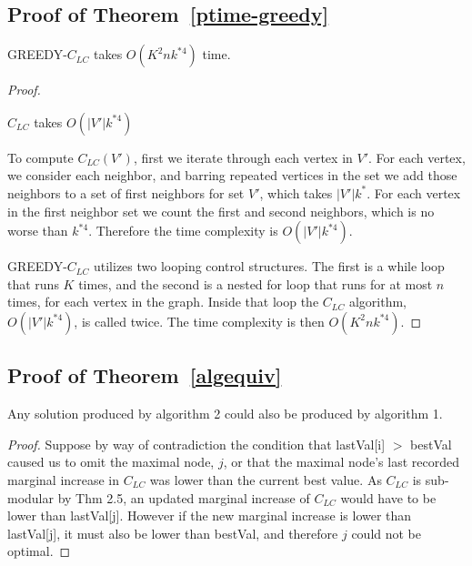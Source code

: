\subsection{Proof of Theorem~\ref{ptime-greedy}}
GREEDY-$C_{LC}$ takes $O(K^2 n k^{*4})$ time.\\
\begin{proof}

\begin{Claim} $C_{LC}$ takes $O(|V'|k^{*4})$ \end{Claim}

To compute $C_{LC}(V')$, first we iterate through each vertex in $V'$.  For each vertex, we consider each neighbor, and barring repeated vertices in the set we add those neighbors to a set of first neighbors for set $V'$, which takes $|V'| k^*$. For each vertex in the first neighbor set we count the first and second neighbors, which is no worse than $k^{*4}$. Therefore the time complexity is $O(|V'| k^{*4})$.

GREEDY-$C_{LC}$ utilizes two looping control structures.  The first is a while loop that runs $K$ times, and the second is a nested for loop that runs for at most $n$ times, for each vertex in the graph.  Inside that loop the $C_{LC}$ algorithm, $O(|V'|k^{*4})$,  is called twice.  The time complexity is then $O(K^2 n k^{*4})$. \end{proof}


\subsection{Proof of Theorem~\ref{algequiv}}
Any solution produced by algorithm 2 could also be produced by algorithm 1.\\
\begin{proof}
Suppose by way of contradiction the condition that lastVal[i] $>$ bestVal caused us to omit the maximal node, $j$, or that the maximal node's last recorded marginal increase in $C_{LC}$ was lower than the current best value.  As $C_{LC}$ is sub-modular by Thm 2.5, an updated marginal increase of $C_{LC}$ would have to be lower than lastVal[j].  However if the new marginal increase is lower than lastVal[j], it must also be lower than bestVal, and therefore $j$ could not be optimal.  \end{proof}

